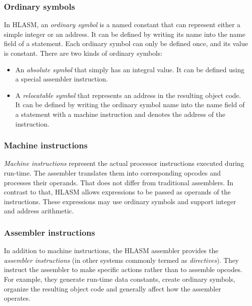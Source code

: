 \subsubsection{Ordinary symbols}

In HLASM, an \emph{ordinary symbol} is a named constant that can represent either a simple integer or an address. It can be defined by writing its name into the name field of a statement. Each ordinary symbol can only be defined once, and its value is constant. There are two kinds of ordinary symbols:
\begin{itemize}
	\item An \emph{absolute symbol} that simply has an integral value. It can be defined using a special assembler instruction.
	\item A \emph{relocatable symbol} that represents an address in the resulting object code. It can be defined by writing the ordinary symbol name into the name field of a statement with a machine instruction and denotes the address of the instruction.
\end{itemize}

\subsubsection{Machine instructions}
\label{mach_instr}

\emph{Machine instructions} represent the actual processor instructions executed during run-time. The assembler translates them into corresponding opcodes and processes their operands. That does not differ from traditional assemblers. In contrast to that, HLASM allows expressions to be passed as operands of the instructions. These expressions may use ordinary symbols and support integer and address arithmetic.

\subsubsection{Assembler instructions}
\label{asm_instrs}

In addition to machine instructions, the HLASM assembler provides the \emph{assembler instructions} (in other systems commonly termed as \emph{directives}). They instruct the assembler to make specific actions rather than to assemble opcodes. For example, they generate run-time data constants, create ordinary symbols, organize the resulting object code and generally affect how the assembler operates.

